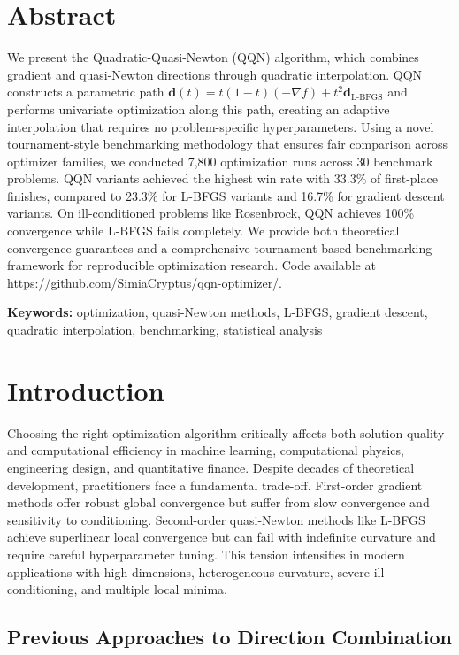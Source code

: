 \hypertarget{abstract}{%
\section{Abstract}\label{abstract}}

We present the Quadratic-Quasi-Newton (QQN) algorithm, which combines gradient and quasi-Newton directions through quadratic interpolation. QQN constructs a parametric path \(\mathbf{d}(t) = t(1-t)(-\nabla f) + t^2 \mathbf{d}_{\text{L-BFGS}}\) and performs univariate optimization along this path, creating an adaptive interpolation that requires no problem-specific hyperparameters. Using a novel tournament-style benchmarking methodology that ensures fair comparison across optimizer families, we conducted 7,800 optimization runs across 30 benchmark problems. QQN variants achieved the highest win rate with 33.3\% of first-place finishes, compared to 23.3\% for L-BFGS variants and 16.7\% for gradient descent variants. On ill-conditioned problems like Rosenbrock, QQN achieves 100\% convergence while L-BFGS fails completely. We provide both theoretical convergence guarantees and a comprehensive tournament-based benchmarking framework for reproducible optimization research. Code available at https://github.com/SimiaCryptus/qqn-optimizer/.

\textbf{Keywords:} optimization, quasi-Newton methods, L-BFGS, gradient descent, quadratic interpolation, benchmarking, statistical analysis

\hypertarget{introduction}{%
\section{Introduction}\label{introduction}}

Choosing the right optimization algorithm critically affects both solution quality and computational efficiency in machine learning, computational physics, engineering design, and quantitative finance.
Despite decades of theoretical development, practitioners face a fundamental trade-off.
First-order gradient methods offer robust global convergence but suffer from slow convergence and sensitivity to conditioning.
Second-order quasi-Newton methods like L-BFGS achieve superlinear local convergence but can fail with indefinite curvature and require careful hyperparameter tuning.
This tension intensifies in modern applications with high dimensions, heterogeneous curvature, severe ill-conditioning, and multiple local minima.

\hypertarget{previous-approaches-to-direction-combination}{%
\subsection{Previous Approaches to Direction Combination}\label{previous-approaches-to-direction-combination}}

